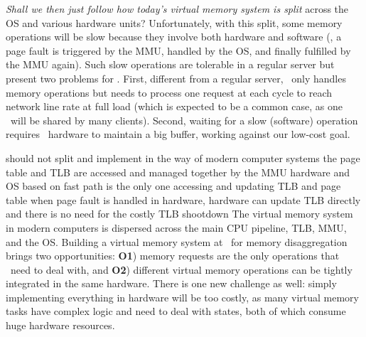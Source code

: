 \textit{Shall we then just follow how today's virtual memory system is split} across the OS and various hardware units?
Unfortunately, with this split, some memory operations will be slow because they involve both hardware and software
(\eg, a page fault is triggered by the MMU, handled by the OS, and finally fulfilled by the MMU again).
Such slow operations are tolerable in a regular server but present two problems for \sysboard.
First, different from a regular server, \sysboard\ only handles memory operations but needs to 
process one request at each cycle to reach network line rate 
at full load (which is expected to be a common case, as one \MN\ will be shared by many clients).
Second, waiting for a slow (software) operation requires \sysboard\ hardware to maintain a big buffer,
working against our low-cost goal.

should not split and implement in the way of modern computer systems
the page table and TLB are accessed and managed together by the MMU hardware and OS
based on 
fast path is the only one accessing and updating TLB and page table
when page fault is handled in hardware, hardware can update TLB directly
and there is no need for the costly TLB shootdown
The virtual memory system in modern computers is dispersed across the main CPU pipeline, TLB, MMU, and the OS.
%
Building a virtual memory system at \MN\ for memory disaggregation brings two opportunities:
{\bf O1}) memory requests are the only operations that \MN\ need to deal with,
and {\bf O2}) different virtual memory operations can be tightly integrated in the same hardware.
There is one new challenge as well: simply implementing everything in hardware
will be too costly, %
as many virtual memory tasks have complex logic and need to deal with states,
both of which consume huge hardware resources. %
\fi


